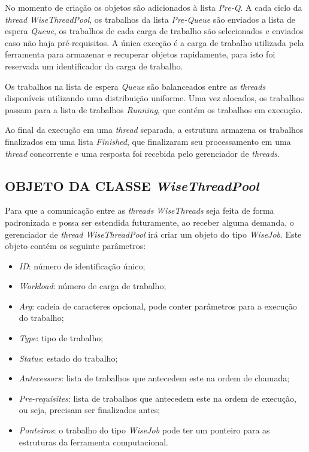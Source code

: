 No momento de criação os objetos são adicionados à lista \textit{Pre-Q}. A cada ciclo da \textit{thread} \textit{WiseThreadPool}, os trabalhos da lista \textit{Pre-Queue} são enviados a lista de espera \textit{Queue}, os trabalhos de cada carga de trabalho são selecionados e enviados caso não haja pré-requisitos. A única exceção é a carga de trabalho utilizada pela ferramenta para armazenar e recuperar objetos rapidamente, para isto foi reservada um identificador da carga de trabalho.

Os trabalhos na lista de espera \textit{Queue} são balanceados entre as \textit{threads} disponíveis utilizando uma distribuição uniforme. Uma vez alocados, os trabalhos passam para a lista de trabalhos \textit{Running}, que contém os trabalhos em execução.

Ao final da execução em uma \textit{thread} separada, a estrutura armazena os trabalhos finalizados em uma lista \textit{Finished}, que finalizaram seu processamento em uma \textit{thread} concorrente e uma resposta foi recebida pelo gerenciador de \textit{threads}.

\subsection{OBJETO DA CLASSE \textit{WiseThreadPool}}\label{sec:trabalhos}

Para que a comunicação entre as \textit{threads} \textit{WiseThreads} seja feita de forma padronizada e possa ser estendida futuramente, ao receber alguma demanda, o gerenciador de \textit{thread} \textit{WiseThreadPool} irá criar um objeto do tipo \textit{WiseJob}. Este objeto contém os seguinte parâmetros:

\begin{itemize}
	\item \textit{ID}: número de identificação único;
	\item \textit{Workload}: número de carga de trabalho;
	\item \textit{Arg}: cadeia de caracteres opcional, pode conter parâmetros para a execução do trabalho;
	\item \textit{Type}: tipo de trabalho;
	\item \textit{Status}: estado do trabalho;
	\item \textit{Antecessors}: lista de trabalhos que antecedem este na ordem de chamada;
	\item \textit{Pre-requisites}: lista de trabalhos que antecedem este na ordem de execução, ou seja, precisam ser finalizados antes;
	\item \textit{Ponteiros}: o trabalho do tipo \textit{WiseJob} pode ter um ponteiro para as estruturas da ferramenta computacional.
\end{itemize}

